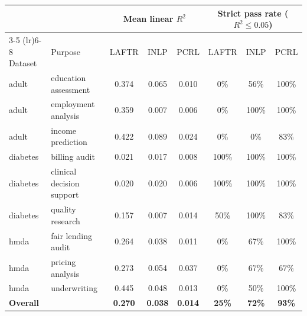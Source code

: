 \begin{tabular}{llcccccc}
\toprule
 & & \multicolumn{3}{c}{Mean linear $R^2$} & \multicolumn{3}{c}{Strict pass rate ($R^2 \leq 0.05$)} \\
\cmidrule(lr){3-5} \cmidrule(lr){6-8}
Dataset & Purpose & LAFTR & INLP & PCRL & LAFTR & INLP & PCRL \\
\midrule
adult & education assessment & 0.374 & 0.065 & 0.010 & 0\% & 56\% & 100\% \\
adult & employment analysis & 0.359 & 0.007 & 0.006 & 0\% & 100\% & 100\% \\
adult & income prediction & 0.422 & 0.089 & 0.024 & 0\% & 0\% & 83\% \\
diabetes & billing audit & 0.021 & 0.017 & 0.008 & 100\% & 100\% & 100\% \\
diabetes & clinical decision support & 0.020 & 0.020 & 0.006 & 100\% & 100\% & 100\% \\
diabetes & quality research & 0.157 & 0.007 & 0.014 & 50\% & 100\% & 83\% \\
hmda & fair lending audit & 0.264 & 0.038 & 0.011 & 0\% & 67\% & 100\% \\
hmda & pricing analysis & 0.273 & 0.054 & 0.037 & 0\% & 67\% & 67\% \\
hmda & underwriting & 0.445 & 0.048 & 0.013 & 0\% & 50\% & 100\% \\
\midrule
\textbf{Overall} & & \textbf{0.270} & \textbf{0.038} & \textbf{0.014} & \textbf{25\%} & \textbf{72\%} & \textbf{93\%} \\
\bottomrule
\end{tabular}
